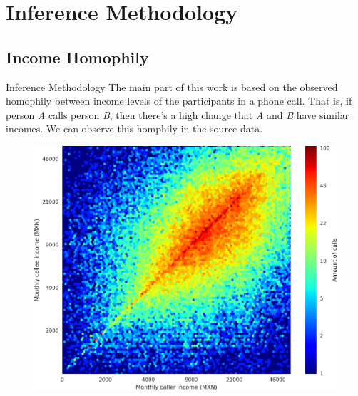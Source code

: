 \documentclass{beamer}
\begin{document}
\section{Inference Methodology}
\subsection{Income Homophily}

\begin{frame}{Inference Methodology}
The main part of this work is based on the observed homophily between income levels of the participants in a phone call. That is, if person \emph{A} calls person \emph{B}, then there's a high change that \emph{A} and \emph{B} have similar incomes. We can observe this homphily in the source data.

\end{frame}
\begin{frame}

\begin{figure}[h]
	\begin{center}
		{\includegraphics[height=0.6\textheight]
		{../figures/Homophily_income_origin_target_1/Homophily_income_origin_target_1.png}
		}\label{homophily_heatmap}
	\end{center}
\end{figure}

\end{frame}
\end{document}
